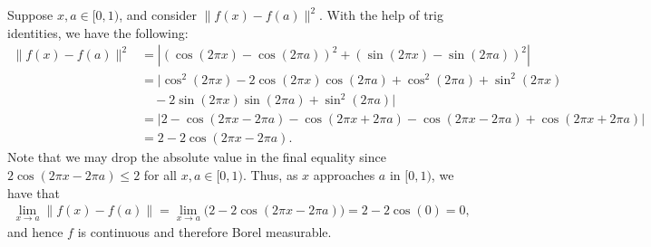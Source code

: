 \begin{homework}[e]
\begin{prf}
		Suppose $x,a \in [0,1)$, and consider $\|f(x) - f(a)\|^2$. With the help of trig identities, we have the following:
		\begin{align*}
			\|f(x) - f(a)\|^2 &= |(\cos(2\pi x)-\cos(2\pi a))^2 + (\sin(2\pi x) - \sin(2\pi a))^2| \\
							  &= |\cos^2(2\pi x) - 2\cos(2\pi x)\cos(2\pi a) + \cos^2(2\pi a) + \sin^2(2\pi x) \\ &\hspace{1em}- 2\sin(2\pi x)\sin(2\pi a) + \sin^2(2\pi a)| \\
							  &= |2 - \cos(2\pi x - 2\pi a) - \cos(2\pi x + 2\pi a) - \cos(2\pi x - 2\pi a) + \cos(2\pi x + 2\pi a)| \\
							  &= 2 - 2\cos(2\pi x - 2\pi a).
		\end{align*}
		Note that we may drop the absolute value in the final equality since $2\cos(2\pi x - 2\pi a) \leq 2$ for all $x,a\in [0,1)$. Thus, as $x$ approaches $a$ in $[0,1)$, we have that
		\begin{align*}
			\lim_{x \to a}\|f(x) - f(a)\| = \lim_{x\to a} \big(2 - 2\cos(2\pi x - 2\pi a) \big)= 2- 2\cos(0) = 0,
		\end{align*}
		and hence $f$ is continuous and therefore Borel measurable.

		\bigskip


\end{prf}
\end{homework}
